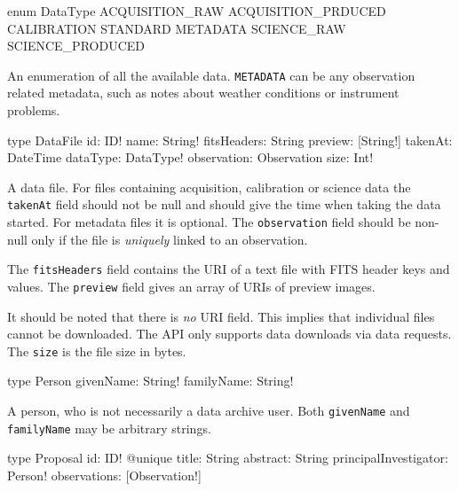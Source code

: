 
\begin{code}
enum DataType {
  ACQUISITION_RAW
  ACQUISITION_PRDUCED
  CALIBRATION
  STANDARD
  METADATA
  SCIENCE_RAW
  SCIENCE_PRODUCED
}
\end{code}

An enumeration of all the available data. \verb|METADATA| can be any observation related metadata, such as notes about weather conditions or instrument problems.


\begin{code}
type DataFile {
  id: ID!
  name: String!
  fitsHeaders: String
  preview: [String!]
  takenAt: DateTime
  dataType: DataType!
  observation: Observation
  size: Int!
}
\end{code}

A data file. For files containing acquisition, calibration or science data the \verb|takenAt| field should not be null and should give the time when taking the data started. For metadata files it is optional. The \verb|observation| field should be non-null only if the file is \emph{uniquely} linked to an observation.

The \verb|fitsHeaders| field contains the URI of a text file with FITS header keys and values. The \verb|preview| field gives an array of URIs of preview images.

\begin{note}
It should be noted that there is \emph{no} URI field. This implies that individual files cannot be downloaded. The API only supports data downloads via data requests. The \verb|size| is the file size in bytes.
\end{note}


\begin{code}
type Person {
  givenName: String!
  familyName: String!
}
\end{code}

A person, who is not necessarily a data archive user. Both \verb|givenName| and \verb|familyName| may be arbitrary strings.


\begin{code}
type Proposal {
  id: ID! @unique
  title: String
  abstract: String
  principalInvestigator: Person!
  observations: [Observation!]
}
\end{code}

